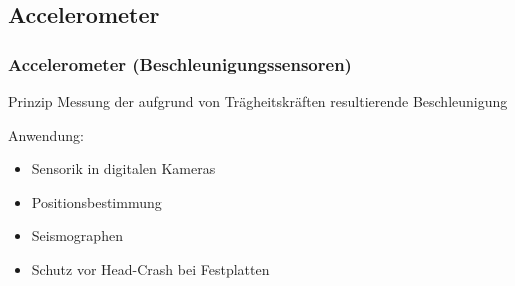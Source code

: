 \documentclass[10pt,a4paper,oneside]{beamer}
\begin{document}
\begin{frame}
	\section{Accelerometer}
	\frametitle{Accelerometer (Beschleunigungssensoren)}
	\begin{block}{Prinzip}
		Messung der aufgrund von Trägheitskräften resultierende Beschleunigung
	\end{block}
	Anwendung:
	\begin{itemize}
  		\item Sensorik in digitalen Kameras
		\item Positionsbestimmung
		\item Seismographen 
		\item Schutz vor Head-Crash bei Festplatten
	\end{itemize}
	\begin{figure}
\hfil
{}\hfil
\end{figure}

\end{frame}
\end{document}
